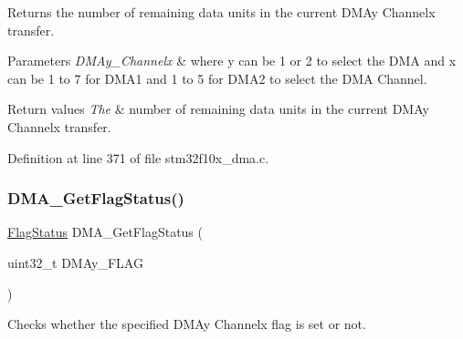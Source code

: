 Returns the number of remaining data units in the current D\+M\+Ay Channelx transfer. 


\begin{DoxyParams}{Parameters}
{\em D\+M\+Ay\+\_\+\+Channelx} & where y can be 1 or 2 to select the D\+MA and x can be 1 to 7 for D\+M\+A1 and 1 to 5 for D\+M\+A2 to select the D\+MA Channel. \\
\hline
\end{DoxyParams}

\begin{DoxyRetVals}{Return values}
{\em The} & number of remaining data units in the current D\+M\+Ay Channelx transfer. \\
\hline
\end{DoxyRetVals}


Definition at line 371 of file stm32f10x\+\_\+dma.\+c.

\mbox{\label{group___d_m_a___exported___functions_gafb30b7a891834c267eefd5d30b688a9f}} 
\subsubsection{\texorpdfstring{D\+M\+A\+\_\+\+Get\+Flag\+Status()}{DMA\_GetFlagStatus()}}
{\footnotesize\ttfamily \hyperlink{group___exported__types_ga89136caac2e14c55151f527ac02daaff}{Flag\+Status} D\+M\+A\+\_\+\+Get\+Flag\+Status (\begin{DoxyParamCaption}\item[{uint32\+\_\+t}]{D\+M\+Ay\+\_\+\+F\+L\+AG }\end{DoxyParamCaption})}



Checks whether the specified D\+M\+Ay Channelx flag is set or not. 


